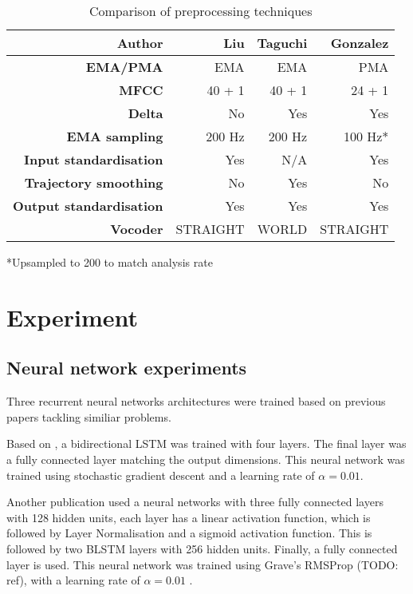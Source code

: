 \documentclass[a4paper]{article}
\begin{document}
\begin{table}[th]
  \caption{Comparison of preprocessing techniques}
  \label{tab:example}
  \centering
  \footnotesize
  \begin{tabular}{ r r r r }
    \toprule
    \textbf{Author} & \textbf{Liu} & \textbf{Taguchi} & \textbf{Gonzalez} \\
    \midrule
    \textbf{EMA/PMA} & EMA & EMA & PMA \\
    \textbf{MFCC} & 40 + 1 & 40 + 1 & 24 + 1 \\
    \textbf{Delta} & No & Yes & Yes \\
    \textbf{EMA sampling} & 200 Hz & 200 Hz & 100 Hz* \\
    \textbf{Input standardisation} & Yes & N/A  & Yes \\
    \textbf{Trajectory smoothing} & No & Yes  & No \\
    \textbf{Output standardisation} & Yes & Yes & Yes \\
    \textbf{Vocoder} & STRAIGHT & WORLD  & STRAIGHT \\
    \bottomrule
    
  \end{tabular}
  *Upsampled to 200 to match analysis rate
\end{table}

\section{Experiment}

\subsection{Neural network experiments} \label{nnexperiment}

Three recurrent neural networks architectures were trained based on previous
papers tackling similiar problems.

Based on \cite{Liu2018}, a bidirectional LSTM was trained with four layers.
The final layer was a fully connected layer matching the output dimensions.
This neural network was trained using stochastic gradient descent and
a learning rate of \( \alpha = 0.01 \).

Another publication \cite{Taguchi} used a neural networks with three fully
connected layers with 128 hidden units, each layer has a linear activation
function, which is followed by Layer Normalisation and a sigmoid activation
function. This is followed by two BLSTM layers with 256 hidden units. Finally,
a fully connected layer is used. This neural network was trained using Grave's RMSProp (TODO: ref),
with a learning rate of \( \alpha = 0.01 \) .
\end{document}
